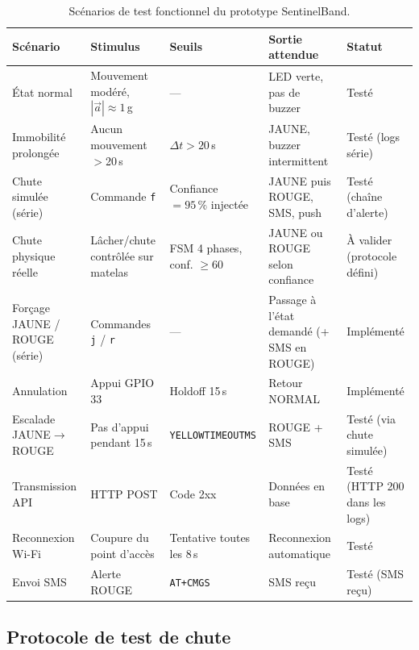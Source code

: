 \documentclass[12pt,a4paper]{article}
\renewcommand{\_}{\textunderscore\allowbreak}
\begin{document}
\begin{table}[H]
\centering
\caption{Scénarios de test fonctionnel du prototype SentinelBand.}
\label{tab:scenarios}
\footnotesize
\begin{tabularx}{\textwidth}{>{\raggedright\arraybackslash}X >{\raggedright\arraybackslash}X >{\raggedright\arraybackslash}X >{\raggedright\arraybackslash}X >{\raggedright\arraybackslash}X}
\toprule
\textbf{Scénario} & \textbf{Stimulus} & \textbf{Seuils} & \textbf{Sortie attendue} & \textbf{Statut} \\
\midrule
État normal & Mouvement modéré, $|\vec{a}| \approx 1$\,g & --- & LED verte, pas de buzzer & Testé \\
\addlinespace
Immobilité prolongée & Aucun mouvement $>$20\,s & $\Delta t > 20$\,s & JAUNE, buzzer intermittent & Testé (logs série) \\
\addlinespace
Chute simulée (série) & Commande \texttt{f} & Confiance $= 95\,\%$ injectée & JAUNE puis ROUGE, SMS, push & Testé (chaîne d'alerte) \\
\addlinespace
Chute physique réelle & Lâcher/chute contrôlée sur matelas & FSM 4 phases, conf. $\geq 60$ & JAUNE ou ROUGE selon confiance & À valider (protocole défini) \\
\addlinespace
Forçage JAUNE / ROUGE (série) & Commandes \texttt{j} / \texttt{r} & --- & Passage à l'état demandé (+ SMS en ROUGE) & Implémenté \\
\addlinespace
Annulation & Appui GPIO\,33 & Holdoff 15\,s & Retour NORMAL & Implémenté \\
\addlinespace
Escalade JAUNE$\rightarrow$ROUGE & Pas d'appui pendant 15\,s & \texttt{YELLOW\_TIMEOUT\_MS} & ROUGE + SMS & Testé (via chute simulée) \\
\addlinespace
Transmission API & HTTP POST & Code 2xx & Données en base & Testé (HTTP 200 dans les logs) \\
\addlinespace
Reconnexion Wi-Fi & Coupure du point d'accès & Tentative toutes les 8\,s & Reconnexion automatique & Testé \\
\addlinespace
Envoi SMS & Alerte ROUGE & \texttt{AT+CMGS} & SMS reçu & Testé (SMS reçu) \\
\bottomrule
\end{tabularx}
\end{table}

\subsection{Protocole de test de chute}
\end{document}
